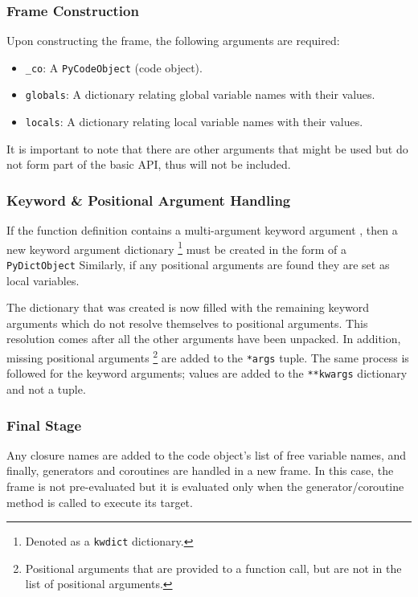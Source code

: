 {			\subsubsection*{Frame Construction}
			\par Upon constructing the frame, the following arguments are required:
			\begin{itemize}
				\item \lstinline|_co|: A \lstinline|PyCodeObject| (code object).
				\item \lstinline|globals|: A dictionary relating global variable names with their values.
				\item \lstinline|locals|: A dictionary relating local variable names with their values.
			\end{itemize}
			It is important to note that there are other arguments that might be used but do not form part of the basic API, thus will not be included.

			\subsubsection*{Keyword \& Positional Argument Handling}
			\par If the function definition contains a multi-argument keyword argument , then a new keyword argument dictionary \footnote{\label{footnote:kwdict_dict}Denoted as a \lstinline|kwdict| dictionary.} must be created in the form of a \lstinline|PyDictObject|
			Similarly, if any positional arguments are found they are set as local variables.

			\par The dictionary that was created is now filled with the remaining keyword arguments which do not resolve themselves to positional arguments. This resolution comes after
			all the other arguments have been unpacked. In addition, missing positional arguments \footnote{Positional arguments that are provided to a function call, but are not in the list of positional arguments.} are 
			added to the \lstinline|*args| tuple. The same process is followed for the keyword arguments; values are added to the \lstinline|**kwargs| dictionary and not a tuple.

			\subsubsection*{Final Stage}
			\par Any closure names are added to the code object's list of free variable names, and finally, generators and coroutines are handled in a new frame. In this case, the frame is not pre-evaluated but it is 
			evaluated only when the generator/coroutine method is called to execute its target.


}

